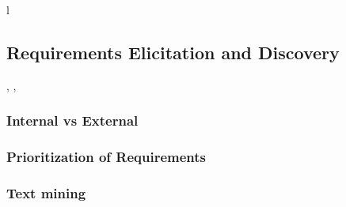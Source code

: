 l\subsection{Requirements Elicitation and Discovery}
\cite{Cleland-Huang:2008}, \cite{Kaiya:2010}, \cite{Castro-Herrera:2009}
\subsubsection{Internal vs External}

\subsubsection{Prioritization of Requirements} 

\subsubsection{Text mining}